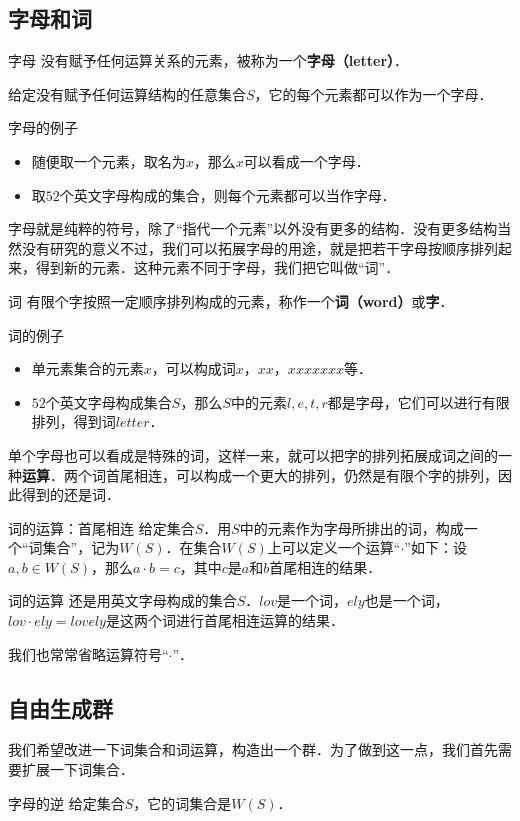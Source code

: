 
\subsection{字母和词}

\begin{definition}{字母}
没有赋予任何运算关系的元素，被称为一个\textbf{字母（letter）}．
\end{definition}

给定没有赋予任何运算结构的任意集合$S$，它的每个元素都可以作为一个字母．

\begin{example}{字母的例子}
\begin{itemize}
\item 随便取一个元素，取名为$x$，那么$x$可以看成一个字母．
\item 取$52$个英文字母构成的集合，则每个元素都可以当作字母．
\end{itemize}
\end{example}

字母就是纯粹的符号，除了“指代一个元素”以外没有更多的结构．没有更多结构当然没有研究的意义不过，我们可以拓展字母的用途，就是把若干字母按顺序排列起来，得到新的元素．这种元素不同于字母，我们把它叫做“词”．

\begin{definition}{词}
有限个字按照一定顺序排列构成的元素，称作一个\textbf{词（word）}或\textbf{字}．
\end{definition}

\begin{example}{词的例子}
\begin{itemize}
\item 单元素集合的元素$x$，可以构成词$x$，$xx$，$xxxxxxx$等．
\item $52$个英文字母构成集合$S$，那么$S$中的元素$l, e, t, r$都是字母，它们可以进行有限排列，得到词$letter$．
\end{itemize}

\end{example}

单个字母也可以看成是特殊的词，这样一来，就可以把字的排列拓展成词之间的一种\textbf{运算}．两个词首尾相连，可以构成一个更大的排列，仍然是有限个字的排列，因此得到的还是词．

\begin{definition}{词的运算：首尾相连}
给定集合$S$．用$S$中的元素作为字母所排出的词，构成一个“词集合”，记为$W(S)$．在集合$W(S)$上可以定义一个运算“$\cdot$”如下：设$a, b\in W(S)$，那么$a\cdot b=c$，其中$c$是$a$和$b$首尾相连的结果．
\end{definition}

\begin{example}{词的运算}
还是用英文字母构成的集合$S$．$lov$是一个词，$ely$也是一个词，$lov\cdot ely=lovely$是这两个词进行首尾相连运算的结果．
\end{example}

我们也常常省略运算符号“$\cdot$”．

\subsection{自由生成群}

我们希望改进一下词集合和词运算，构造出一个群．为了做到这一点，我们首先需要扩展一下词集合．

\begin{definition}{字母的逆}
给定集合$S$，它的词集合是$W(S)$．
\end{definition}


